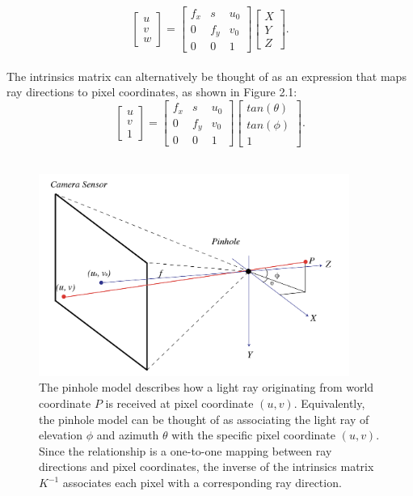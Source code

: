 \begin{equation}
\begin{bmatrix}
    u\\
    v\\
    w
\end{bmatrix} = 
\begin{bmatrix}
    f_x & s & u_0 \\ 
    0 & f_y  & v_0 \\ 
    0 & 0 & 1 
\end{bmatrix}
\begin{bmatrix}
    X \\
    Y \\
    Z
\end{bmatrix}.
\end{equation}\\
The intrinsics matrix can alternatively be thought of as an expression that maps ray directions to pixel coordinates, as shown in Figure 2.1:\\
\begin{equation}
\begin{bmatrix}
    u\\
    v\\
    1
\end{bmatrix} = 
\begin{bmatrix}
    f_x & s & u_0 \\ 
    0 & f_y  & v_0 \\ 
    0 & 0 & 1 
\end{bmatrix}
\begin{bmatrix}
    tan(\theta) \\
    tan(\phi) \\
    1
\end{bmatrix}.
\end{equation}\\
\begin{figure}[htbp]
    \centering 
    \includegraphics[width=4in]{images/pinhole.png}
    \caption[The pinhole model of the camera]{The pinhole model describes how a light ray originating from world coordinate $P$ is received at pixel coordinate $(u, v)$. Equivalently, the pinhole model can be thought of as associating the light ray of elevation $\phi$ and azimuth $\theta$ with the specific pixel coordinate $(u, v)$. Since the relationship is a one-to-one mapping between ray directions and pixel coordinates, the inverse of the intrinsics matrix $K^{-1}$ associates each pixel with a corresponding ray direction.}
\end{figure}

